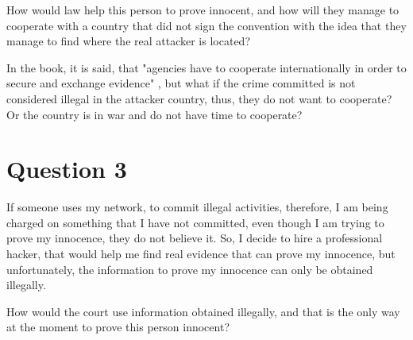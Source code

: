 \documentclass[a4paper,12pt]{article}
\begin{document}
How would law help this person to prove innocent, and how will they manage to cooperate with a country that did not sign the convention with the idea that they manage to find where the real attacker is located? 

In the book, it is said, that "agencies have to cooperate internationally in order to secure and exchange evidence" \cite{book1}, but what if the crime committed is not considered illegal in the attacker country, thus, they do not want to cooperate? Or the country is in war and do not have time to cooperate? 

%
%
%

\section{Question 3}
If someone uses my network, to commit illegal activities, therefore, I am being charged on something that I have not committed, even though I am trying to prove my innocence, they do not believe it. So, I decide to hire a professional hacker, that would help me find real evidence that can prove my innocence, but unfortunately, the information to prove my innocence can only be obtained illegally. 

How would the court use information obtained illegally, and that is the only way at the moment to prove this person innocent? 



\end{document}
